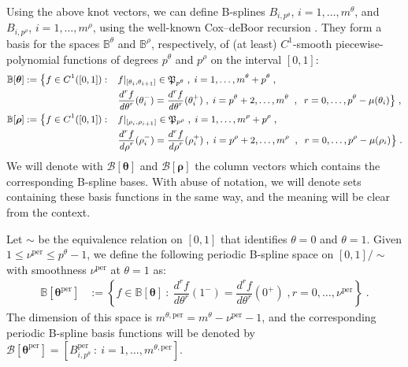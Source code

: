 \documentclass[10pt]{article}
\newcommand{\mbf}[1]{{\boldsymbol{#1}}}
\newcommand{\PP}{{\mathfrak{P}}}
\newcommand{\basis}[1]{\mathcal{#1}}
\newcommand{\vSpace}[1]{\mathbb{#1}}
\newcommand{\cU}{\theta}
\newcommand{\cV}{\rho}
\newcommand{\dcU}{\mathit{d\cU}}
\newcommand{\dcV}{\mathit{d\cV}}
\newcommand{\degU}{p^\cU}
\newcommand{\degV}{p^\cV}
\newcommand{\kntU}{\cU}
\newcommand{\kntV}{\cV}
\newcommand{\kntsU}{\mbf{\kntU}}
\newcommand{\kntsV}{\mbf{\kntV}}
\newcommand{\pkntsU}{\kntsU^\per}
\newcommand{\mult}[1]{\mu(#1)}
\newcommand{\ndofU}{m^\cU}
\newcommand{\ndofV}{m^\cV}
\newcommand{\bsp}{B}
\newcommand{\bspB}{\basis{\bsp}}
\newcommand{\bspS}{\vSpace{\bsp}}
\newcommand{\per}{\mathrm{per}}
\newcommand{\pSmU}{\nu^\per}
\newcommand{\pndofU}{m^{\cU,\per}}
\theoremstyle{plain}
\theoremstyle{definition}
\theoremstyle{remark}
\begin{document}
Using the above knot vectors, we can define B-splines $\bsp_{i,\degU}$, $i = 1,\dots,\ndofU$, and $\bsp_{i,\degV}$, $i = 1,\dots,\ndofV$, using the well-known Cox--deBoor recursion \cite{deBoor:1978}.
They form a basis for the spaces $\bspS^\cU$ and $\bspS^\cV$, respectively, of (at least) $C^1$-smooth piecewise-polynomial functions of degrees $\degU$ and $\degV$ on the interval $[0,1]$:
\begin{equation}
  \small
\begin{aligned}
  \bspS[\kntsU] &:= \big\{f\in C^1([0,1]): &&f|_{[\kntU_i, \kntU_{i+1}]} \in \PP_{\degU}\;,\;i=1,\dots,\ndofU+\degU\;,\\
  & &&\dfrac{d^rf}{\dcU^r}(\kntU_i^{-}) = \dfrac{d^rf}{\dcU^r}(\kntU_i^{+})\;,\;i=\degU+2,\dots,\ndofU\;\;,\;\;r = 0, \dots, \degU - \mult{\kntU_i}\big\}\;,\\
  \bspS[\kntsV] &:= \big\{f\in C^1([0,1]): &&f|_{[\kntV_i, \kntV_{i+1}]} \in \PP_{\degV}\;,\;i=1,\dots,\ndofV+\degV\;,\\
  & &&\dfrac{d^rf}{\dcV^r}(\kntV_i^{-}) = \dfrac{d^rf}{\dcV^r}(\kntV_i^{+})\;,\;i=\degV+2,\dots,\ndofV\;\;,\;\;r = 0, \dots, \degV - \mult{\kntV_i}\big\}\;.
\end{aligned}
\end{equation}
We will denote with $\bspB[\kntsU]$ and $\bspB[\kntsV]$ the column vectors which contains the corresponding B-spline bases.
With abuse of notation, we will denote sets containing these basis functions in the same way, and the meaning will be clear from the context.


Let $\sim$ be the equivalence relation on $[0,1]$ that identifies $\cU = 0$ and $\cU = 1$.
Given $1 \leq \pSmU \leq \degU-1$, we define the following periodic B-spline space on $[0, 1] / \sim$ with smoothness $\pSmU$ at $\cU=1$ as:
\begin{equation}
  \begin{split}
      \bspS[\pkntsU] &:= \left\{f \in \bspS[\kntsU]~:~\dfrac{d^rf}{\dcU^r}(1^-) = \dfrac{d^rf}{\dcU^r}(0^+)\;,r = 0, \dots, \pSmU\right\}\;.
  \end{split}
\end{equation}
The dimension of this space is $\pndofU = \ndofU - \pSmU - 1$, and the corresponding periodic B-spline basis functions will be denoted by $\bspB[\pkntsU] = [\bsp^\per_{i,\degU}~:~i = 1, \dots, \pndofU]$.
\end{document}
